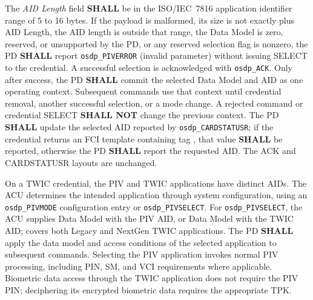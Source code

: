 The \emph{AID Length} field \textbf{SHALL} be in the ISO/IEC~7816 application
identifier range of 5 to 16 bytes. If the payload is malformed, its size is not
exactly  plus AID Length, the AID length is outside that range,
the Data Model is zero, reserved, or unsupported by the PD, or any reserved
selection flag is nonzero, the PD \textbf{SHALL} report
\texttt{osdp\_PIVERROR}  (invalid parameter) without issuing SELECT
to the credential. A successful selection is acknowledged with \texttt{osdp\_ACK}.
Only after success, the PD \textbf{SHALL} commit the selected Data Model and AID
as one operating context. Subsequent commands use that context until credential
removal, another successful selection, or a mode change. A rejected command or
credential SELECT \textbf{SHALL NOT} change the previous context.
The PD \textbf{SHALL} update the selected AID reported by
\texttt{osdp\_CARDSTATUSR}; if the credential returns an FCI template containing
tag , that value \textbf{SHALL} be reported, otherwise the PD
\textbf{SHALL} report the requested AID. The ACK and CARDSTATUSR layouts are unchanged.

On a TWIC credential, the PIV and TWIC applications have distinct AIDs. The ACU
determines the intended application through system configuration, using an
\texttt{osdp\_PIVMODE} configuration entry or \texttt{osdp\_PIVSELECT}.
For \texttt{osdp\_PIVSELECT}, the ACU supplies Data Model  with
the PIV AID, or Data Model  with the TWIC AID; 
covers both Legacy and NextGen TWIC applications.
The PD \textbf{SHALL} apply the data model and access conditions of the selected
application to subsequent commands. Selecting the PIV application invokes normal
PIV processing, including PIN, SM, and VCI requirements where applicable.
Biometric data access through the TWIC application does not require the PIV PIN;
deciphering its encrypted biometric data requires the appropriate TPK.

